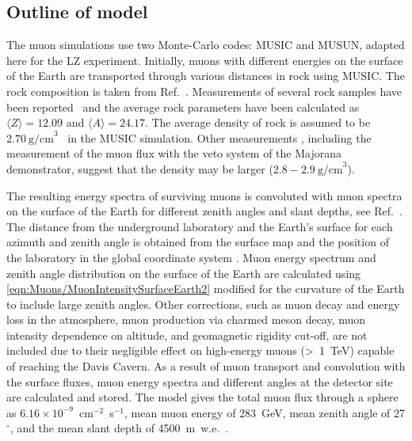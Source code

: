 \subsection{Outline of model}\label{sec:Muons/ModelOutline}
The muon simulations use two Monte-Carlo codes: MUSIC and MUSUN, adapted here for the LZ experiment. Initially, muons with different energies on the surface of the Earth are transported through various distances in rock using MUSIC. The rock composition is taken from Ref.~\cite{mei,zhang}. Measurements of several rock samples have been reported~\cite{mei,zhang} and the average rock parameters have been calculated as $\langle Z\rangle=12.09$ and $\langle A\rangle=24.17$. The average density of rock is assumed to be $2.70~\text{g/cm}^3$~\cite{zhang} in the MUSIC simulation. Other measurements \cite{Heise:2021eym}, including the measurement of the muon flux with the veto system of the Majorana demonstrator, suggest that the density may be larger ($2.8-2.9~\text{g/cm}^3$\cite{majorana}).

The resulting energy spectra of surviving muons is convoluted with muon spectra on the surface of the Earth for different zenith angles and slant depths, see Ref.~\cite{musun}. The distance from the underground laboratory and the Earth's surface for each azimuth and zenith angle is obtained from the surface map and the position of the laboratory in the global coordinate system \cite{richardson}.
Muon energy spectrum and zenith angle distribution on the surface of the Earth are calculated using \autoref{eqn:Muons/MuonIntensitySurfaceEarth2} modified for the curvature of the Earth to include large zenith angles. Other corrections, such as muon decay and energy loss in the atmosphere, muon production via charmed meson decay, muon intensity dependence on altitude, and geomagnetic rigidity cut-off, are not included due to their negligible effect on high-energy muons (\textgreater~1~TeV) capable of reaching the Davis Cavern.
As a result of muon transport and convolution with the surface fluxes, muon energy spectra and different angles at the detector site are calculated and stored. The model gives the total muon flux through a sphere as $6.16\times10^{-9}$~cm$^{-2}$~s$^{-1}$, mean muon energy of 283~GeV, mean zenith angle of 27$^{\circ}$, and the mean slant depth of 4500~m~w.e.~\cite{musun-lz}.


